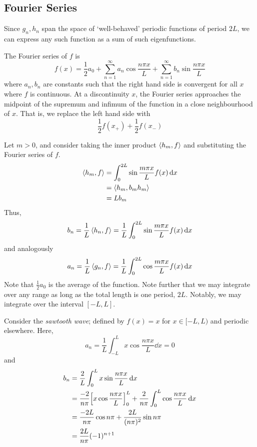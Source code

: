 \subsection{Fourier Series}
Since \( g_n, h_n \) span the space of `well-behaved' periodic functions of period \( 2L \), we can express any such function as a sum of such eigenfunctions.
\begin{definition}
The Fourier series of \( f \) is
\[ f(x) = \frac{1}{2}a_0 + \sum_{n=1}^\infty a_n \cos \frac{n \pi x}{L} + \sum_{n=1}^\infty b_n \sin \frac{n \pi x}{L} \]
where \( a_n, b_n \) are constants such that the right hand side is convergent for all \( x \) where \( f \) is continuous.
At a discontinuity \( x \), the Fourier series approaches the midpoint of the supremum and infimum of the function in a close neighbourhood of \( x \).
That is, we replace the left hand side with
\[ \frac{1}{2}f(x_+) + \frac{1}{2}f(x_-) \]
\end{definition}
\noindent Let \( m > 0 \), and consider taking the inner product \( \left\langle{h_m, f}\right\rangle \) and substituting the Fourier series of \( f \).
\begin{align*}
    \left\langle{h_m, f}\right\rangle &= \int_0^{2L} \sin\frac{m \pi x}{L} f(x) \dd{x} \\
    &= \left\langle{h_m, b_m h_m}\right\rangle \\
    &= L b_m
\end{align*}
Thus,
\[ b_n = \frac{1}{L} \left\langle{h_n, f}\right\rangle = \frac{1}{L} \int_0^{2L} \sin\frac{m \pi x}{L} f(x) \dd{x} \]
and analogously
\[ a_n = \frac{1}{L} \left\langle{g_n, f}\right\rangle = \frac{1}{L} \int_0^{2L} \cos\frac{m \pi x}{L} f(x) \dd{x} \]
Note that \( \frac{1}{2} a_0 \) is the average of the function.
Note further that we may integrate over any range as long as the total length is one period, \( 2L \).
Notably, we may integrate over the interval \( [-L, L] \).

\begin{example}
    Consider the \textit{sawtooth wave}; defined by \( f(x) = x \) for \( x \in [-L, L) \) and periodic elsewhere.
    Here,
    \[ a_n = \frac{1}{L} \int_{-L}^L x \cos \frac{n\pi x}{L} \dd{x} = 0 \]
    and
    \begin{align*}
        b_n &= \frac{2}{L} \int_0^L x \sin \frac{n\pi x}{L} \dd{x} \\
        &= \frac{-2}{n\pi} \qty[x \cos \frac{n\pi x}{L}]_0^L + \frac{2}{n\pi} \int_0^L \cos \frac{n \pi x}{L} \dd{x} \\
        &= \frac{-2L}{n\pi} \cos n \pi + \frac{2L}{(n\pi)^2} \sin n \pi \\
        &= \frac{2L}{n\pi} (-1)^{n+1}
    \end{align*}
\end{example}
